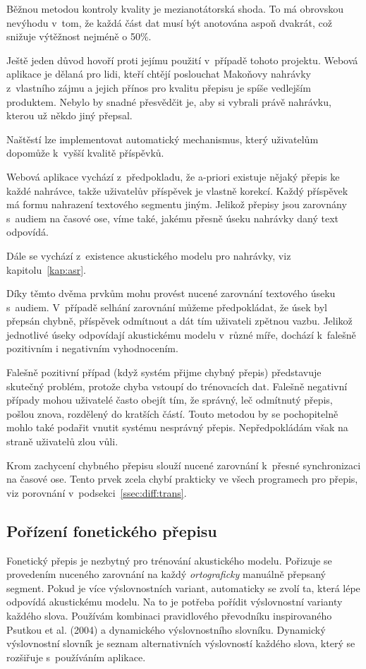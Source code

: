 Běžnou metodou kontroly kvality je mezianotátorská shoda. To má obrovskou
nevýhodu v~tom, že každá část dat musí být anotována aspoň dvakrát, což snižuje
výtěžnost nejméně o 50\%.

Ještě jeden důvod hovoří proti jejímu použití v~případě tohoto projektu. Webová
aplikace je dělaná pro lidi, kteří chtějí poslouchat Makoňovy nahrávky
z~vlastního zájmu a jejich přínos pro kvalitu přepisu je spíše vedlejším
produktem. Nebylo by snadné přesvědčit je, aby si vybrali právě nahrávku, kterou
už někdo jiný přepsal.

Naštěstí lze implementovat automatický mechanismus, který uživatelům dopomůže
k~vyšší kvalitě příspěvků.

Webová aplikace vychází z~předpokladu, že a-priori existuje nějaký přepis ke
každé nahrávce, takže uživatelův příspěvek je vlastně korekcí. Každý příspěvek
má formu nahrazení textového segmentu jiným. Jelikož přepisy jsou zarovnány
s~audiem na časové ose, víme také, jakému přesně úseku nahrávky daný text
odpovídá.

Dále se vychází z~existence akustického modelu pro nahrávky, viz kapitolu~\ref{kap:asr}.

Díky těmto dvěma prvkům mohu provést nucené zarovnání textového úseku
s~audiem. V~případě selhání zarovnání můžeme předpokládat, že úsek byl přepsán
chybně, příspěvek odmítnout a dát tím uživateli zpětnou vazbu. Jelikož
jednotlivé úseky odpovídají akustickému modelu v~různé míře, dochází k~falešně
pozitivním i negativním vyhodnocením.

Falešně pozitivní případ (když systém přijme chybný přepis) představuje skutečný
problém, protože chyba vstoupí do trénovacích dat. Falešně negativní případy
mohou uživatelé často obejít tím, že správný, leč odmítnutý přepis, pošlou
znova, rozdělený do kratších částí. Touto metodou by se pochopitelně mohlo také
podařit vnutit systému nesprávný přepis. Nepředpokládám však na straně uživatelů
zlou vůli.

Krom zachycení chybného přepisu slouží nucené zarovnání k~přesné synchronizaci
na časové ose. Tento prvek zcela chybí prakticky ve všech programech pro přepis,
viz porovnání v~podsekci~\ref{ssec:diff:trans}.

\subsection{Pořízení fonetického přepisu}
\label{ssec:porizeni-fonetickeho-prepisu}

Fonetický přepis je nezbytný pro trénování akustického modelu. Pořizuje se
provedením nuceného zarovnání na každý {\em ortograficky} manuálně přepsaný segment. Pokud je více
výslovnostních variant, automaticky se zvolí ta, která lépe odpovídá akustickému
modelu. Na to je potřeba pořídit výslovnostní varianty každého slova. Používám
kombinaci pravidlového převodníku inspirovaného Psutkou et
al. (2004)\cite{psutka2004development} a dynamického výslovnostního slovníku. Dynamický
výslovnostní slovník je seznam alternativních výslovností každého slova, který
se rozšiřuje s~používáním aplikace.

